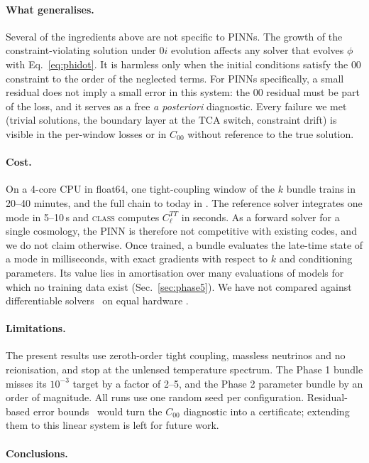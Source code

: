 \paragraph{What generalises.} Several of the ingredients above are not specific to PINNs. The growth of the constraint-violating solution under $0i$ evolution affects any solver that evolves $\phi$ with Eq.~\eqref{eq:phidot}. It is harmless only when the initial conditions satisfy the $00$ constraint to the order of the neglected terms. For PINNs specifically, a small residual does not imply a small error in this system: the $00$ residual must be part of the loss, and it serves as a free \emph{a posteriori} diagnostic. Every failure we met (trivial solutions, the boundary layer at the TCA switch, constraint drift) is visible in the per-window losses or in $C_{00}$ without reference to the true solution.

\paragraph{Cost.} On a 4-core CPU in float64, one tight-coupling window of the $k$ bundle trains in 20--40 minutes, and the full chain to today in . The reference solver integrates one mode in 5--10\,s and \textsc{class} computes $C_\ell^{TT}$ in seconds. As a forward solver for a single cosmology, the PINN is therefore not competitive with existing codes, and we do not claim otherwise. Once trained, a bundle evaluates the late-time state of a mode in milliseconds, with exact gradients with respect to $k$ and conditioning parameters. Its value lies in amortisation over many evaluations of models for which no training data exist (Sec.~\ref{sec:phase5}). We have not compared against differentiable solvers~\cite{DISCOEB,ABCMB,SymBoltz} on equal hardware .

\paragraph{Limitations.} The present results use zeroth-order tight coupling, massless neutrinos and no reionisation, and stop at the unlensed temperature spectrum. The Phase 1 bundle misses its $10^{-3}$ target by a factor of 2--5, and the Phase 2 parameter bundle by an order of magnitude. All runs use one random seed per configuration. Residual-based error bounds~\cite{Liu2022bounds,Chantada2024bounds,GomezBachar2025} would turn the $C_{00}$ diagnostic into a certificate; extending them to this linear system is left for future work.

\paragraph{Conclusions.} 
